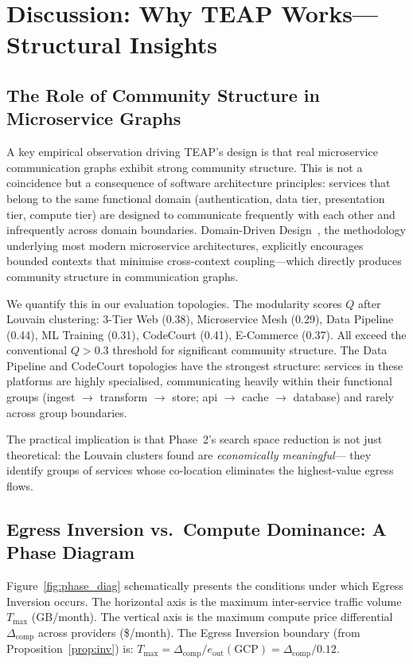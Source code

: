 \documentclass[sigconf,10pt]{acmart}
\begin{document}
\section{Discussion: Why TEAP Works---Structural Insights}\label{sec:discussion}

\subsection{The Role of Community Structure in Microservice Graphs}

A key empirical observation driving TEAP's design is that real microservice
communication graphs exhibit strong community structure.
This is not a coincidence but a consequence of software architecture principles:
services that belong to the same functional domain (authentication, data tier,
presentation tier, compute tier) are designed to communicate frequently with each
other and infrequently across domain boundaries.
Domain-Driven Design~\cite{evans2003}, the methodology underlying most modern
microservice architectures, explicitly encourages bounded contexts that minimise
cross-context coupling---which directly produces community structure in
communication graphs.

We quantify this in our evaluation topologies.
The modularity scores $Q$ after Louvain clustering:
3-Tier Web (0.38), Microservice Mesh (0.29), Data Pipeline (0.44),
ML Training (0.31), CodeCourt (0.41), E-Commerce (0.37).
All exceed the conventional $Q > 0.3$ threshold for significant community structure.
The Data Pipeline and CodeCourt topologies have the strongest structure:
services in these platforms are highly specialised, communicating heavily within
their functional groups (ingest $\to$ transform $\to$ store; api $\to$ cache $\to$
database) and rarely across group boundaries.

The practical implication is that Phase~2's search space reduction is not
just theoretical: the Louvain clusters found are \emph{economically meaningful}---
they identify groups of services whose co-location eliminates the highest-value
egress flows.

\subsection{Egress Inversion vs.\ Compute Dominance: A Phase Diagram}

Figure~\ref{fig:phase_diag} schematically presents the conditions under which
Egress Inversion occurs.
The horizontal axis is the maximum inter-service traffic volume $T_{\max}$ (GB/month).
The vertical axis is the maximum compute price differential $\Delta_\text{comp}$
across providers (\$/month).
The Egress Inversion boundary (from Proposition~\ref{prop:inv}) is:
$T_{\max} = \Delta_\text{comp} / e_{\text{out}}(\text{GCP}) = \Delta_\text{comp} / 0.12$.
\end{document}
